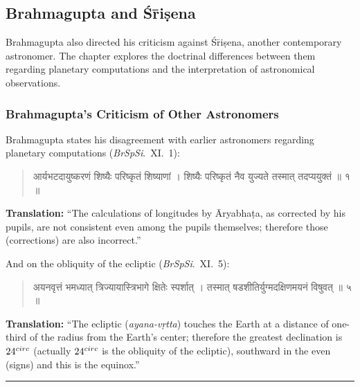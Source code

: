 \documentclass[11pt,a4paper]{article}
\newcommand{\longline}{\noindent\rule{\textwidth}{0.4pt}}
\newcommand{\dev}[1]{{\devanagarifont #1}}
\newenvironment{sanskritverse}{%
  \begin{quote}
  \devanagarifont
  \small
  \color{titlecolor}
}{\end{quote}}
\theoremstyle{definition}
\begin{document}
\subsection{Brahmagupta and \'S\=ri\d{s}ena}

Brahmagupta also directed his criticism against \'S\=ri\d{s}ena, another contemporary astronomer. The chapter explores the doctrinal differences between them regarding planetary computations and the interpretation of astronomical observations.


\subsubsection{Brahmagupta's Criticism of Other Astronomers}

Brahmagupta states his disagreement with earlier astronomers regarding planetary computations (\textit{BrSpSi}.\ XI.\ 1):

\begin{sanskritverse}
\dev{आर्यभटदायुष्करणं शिष्यैः परिष्कृतं शिष्याणां ।}
\dev{शिष्यैः परिष्कृतं नैव युज्यते तस्मात् तदप्ययुक्तं ॥ १ ॥}
\end{sanskritverse}

\textbf{Translation:} ``The calculations of longitudes by \=Aryabha\d{t}a, as corrected by his pupils, are not consistent even among the pupils themselves; therefore those (corrections) are also incorrect.''

And on the obliquity of the ecliptic (\textit{BrSpSi}.\ XI.\ 5):

\begin{sanskritverse}
\dev{अयनवृत्तं भमध्यात् त्रिज्यायास्त्रिभागे क्षितेः स्पर्शात् ।}
\dev{तस्मात् षडशीतिर्युग्मदक्षिणमयनं विषुवत् ॥ ५ ॥}
\end{sanskritverse}

\textbf{Translation:} ``The ecliptic (\textit{ayana-v\d{r}tta}) touches the Earth at a distance of one-third of the radius from the Earth's center; therefore the greatest declination is $24^{\\circ}$ (actually $24^{\\circ}$ is the obliquity of the ecliptic), southward in the even (signs) and this is the equinox.''

\vspace{0.3cm}

\longline

\end{document}
